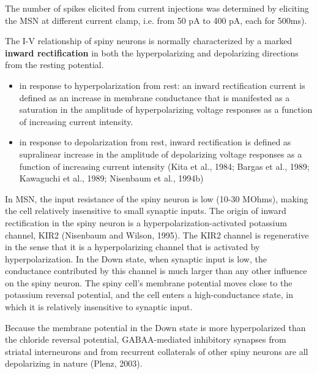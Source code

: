 The number of spikes elicited from current injections was determined by
eliciting the MSN at different current clamp, i.e. from 50 pA to 400 pA,
each for 500ms).

The I-V relationship of spiny neurons is normally characterized by a marked
{\bf inward rectification} in both the hyperpolarizing and depolarizing
directions from the resting potential.
\begin{itemize}
  \item in response to hyperpolarization from rest: an inward rectification
  current is defined as an increase in membrane conductance
that is manifested as a saturation in the amplitude of
hyperpolarizing voltage responses as a function of increasing
current intensity.

  \item in response to depolarization from rest, inward
rectification is defined as supralinear increase in the amplitude of
depolarizing voltage responses as a function of increasing current intensity
(Kita et al., 1984; Bargas et al., 1989; Kawaguchi et al., 1989; Nisenbaum et
al., 1994b)

\end{itemize}

 In MSN, the input resistance of the spiny neuron is low (10-30 MOhms), making
 the cell relatively insensitive to small synaptic inputs. The origin of inward
 rectification in the spiny neuron is a hyperpolarization-activated potassium
 channel, KIR2 (Nisenbaum and Wilson, 1995). The KIR2 channel is regenerative in
 the sense that it is a hyperpolarizing channel that is activated by
 hyperpolarization. In the Down state, when synaptic input is low, the
 conductance contributed by this channel is much larger than any other influence
 on the spiny neuron. The spiny cell's membrane potential moves close to the
 potassium reversal potential, and the cell enters a high-conductance state, in
 which it is relatively insensitive to synaptic input.

 Because the membrane potential in the Down state is more hyperpolarized than
 the chloride reversal potential, GABAA-mediated inhibitory synapses from
 striatal interneurons and from recurrent collaterals of other spiny neurons are
 all depolarizing in nature (Plenz, 2003).

%
%
%


